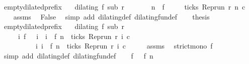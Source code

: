 \begin{isabellebody}
\isamarkupfalse%
\ empty{\isacharunderscore}dilated{\isacharunderscore}prefix{\isacharcolon}\isanewline
\ \ \ {\isacartoucheopen}dilating\ f\ sub\ r{\isacartoucheclose}\isanewline
\ \ \ \ \ \ \ {\isacartoucheopen}n\ {\isacharless}\ f\ {}{\isacartoucheclose}\isanewline
{}\ \ \ {\isacartoucheopen}{\isasymnot}\ ticks\ {\isacharparenleft}{\isacharparenleft}Rep{\isacharunderscore}run\ r{\isacharparenright}\ n\ c{\isacharparenright}{\isacartoucheclose}\isanewline
%
\isadelimproof
%
\endisadelimproof
%
\isatagproof
{}\isamarkupfalse%
\ {\isacharminus}\isanewline
\ \ \isamarkupfalse%
\ assms\ \isamarkupfalse%
\ False\ \isamarkupfalse%
\ {\isacharparenleft}simp\ add{\isacharcolon}\ dilating{\isacharunderscore}def\ dilating{\isacharunderscore}fun{\isacharunderscore}def{\isacharparenright}\isanewline
\ \ \isamarkupfalse%
\ {\isacharquery}thesis\ \isacommand{{\isachardot}{\isachardot}}\isamarkupfalse%
\isanewline
{}\isamarkupfalse%
%
\endisatagproof
{\isafoldproof}%
%
\isadelimproof
\isanewline
%
\endisadelimproof
\isanewline
{}\isamarkupfalse%
\ empty{\isacharunderscore}dilated{\isacharunderscore}prefix{\isacharprime}{\isacharcolon}\isanewline
\ \ \ {\isacartoucheopen}dilating\ f\ sub\ r{\isacartoucheclose}\isanewline
\ \ \ \ \ {\isacartoucheopen}{\isacharbraceleft}i{\isachardot}\ f\ {}\ {\isasymle}\ i\ {\isasymand}\ i\ {\isasymle}\ f\ n\ {\isasymand}\ ticks\ {\isacharparenleft}{\isacharparenleft}Rep{\isacharunderscore}run\ r{\isacharparenright}\ i\ c{\isacharparenright}{\isacharbraceright}\isanewline
\ \ \ \ \ \ \ \ \ {\isacharequal}\ {\isacharbraceleft}i{\isachardot}\ i\ {\isasymle}\ f\ n\ {\isasymand}\ ticks\ {\isacharparenleft}{\isacharparenleft}Rep{\isacharunderscore}run\ r{\isacharparenright}\ i\ c{\isacharparenright}{\isacharbraceright}{\isacartoucheclose}\isanewline
%
\isadelimproof
%
\endisadelimproof
%
\isatagproof
{}\isamarkupfalse%
\ {\isacharminus}\isanewline
\ \ \isamarkupfalse%
\ assms\ \isamarkupfalse%
\ {\isacartoucheopen}strict{\isacharunderscore}mono\ f{\isacartoucheclose}\ \isamarkupfalse%
\ {\isacharparenleft}simp\ add{\isacharcolon}\ dilating{\isacharunderscore}def\ dilating{\isacharunderscore}fun{\isacharunderscore}def{\isacharparenright}\isanewline
\ \ \isamarkupfalse%
\ {\isacartoucheopen}f\ {}\ {\isasymle}\ f\ n{\isacartoucheclose}\ \isamarkupfalse%

\end{isabellebody}
